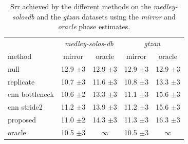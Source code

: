 \documentclass{article}
\newcommand{\ml}[1]{\textcolor{blue}{ML : #1}}
\begin{document}

\begin{table}
  \caption{Srr achieved by the different methods on the \textit{medley-solosdb} and the \textit{gtzan} datasets using the \textit{mirror} and \textit{oracle} phase estimates.}
  \label{tab:srr}
  \begin{center}
\begin{tabular}{lcc|cc}
  & \multicolumn{2}{c|}{\textit{medley-solos-db}} & \multicolumn{2}{c}{\textit{gtzan}} \\
  method & mirror & oracle & mirror & oracle \\
\hline
null & 12.9 $\pm$3 & 12.9 $\pm$3 & 12.9 $\pm$3 &  12.9 $\pm$3\\
replicate & 10.7 $\pm$3 & 11.6 $\pm$3 & 10.8 $\pm$3 & 13.3 $\pm$3\\
\hline
cnn bottleneck & 10.6 $\pm$2 &  13.3 $\pm$3 & 11.1 $\pm$3 & 15.6 $\pm$3 \\
cnn stride2 & 11.2 $\pm$3 & 13.9 $\pm$3 & 11.2 $\pm$3 & 15.6 $\pm$3 \\
\hline
proposed  & 11.0 $\pm$2 & 14.3 $\pm$3  & 11.3 $\pm$3 & 16.3 $\pm$3 \\
\hline
oracle & 10.5 $\pm$3 & $\infty$ & 10.5 $\pm$3 & $\infty$ \\
\end{tabular}
\end{center}
\vspace{-4mm}
\end{table}

\end{document}
